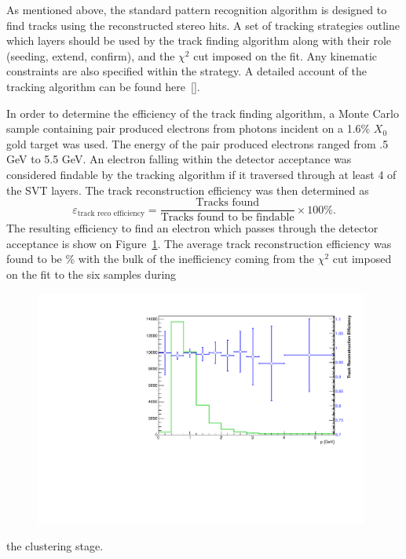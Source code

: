 As mentioned above, the standard pattern recognition algorithm is designed to 
find tracks using the reconstructed stereo hits.  A set of tracking strategies
outline which layers should be used by the track finding algorithm along
with their role (seeding, extend, confirm), and the $\chi^2$ cut imposed 
on the fit. Any kinematic constraints are also specified within the strategy.
A detailed account of the tracking algorithm can be found  here~\ref{}.

In order to determine the efficiency of the track finding algorithm, a Monte
Carlo sample containing pair produced electrons from photons incident on 
a 1.6\% $X_0$ gold target was used.  The energy of the pair produced electrons
ranged from .5 GeV to 5.5 GeV. An electron falling within the detector 
acceptance was considered findable by the tracking algorithm if it 
traversed through at least 4 of the SVT layers. The track reconstruction
efficiency was then determined as
\[
    \varepsilon_{\mbox{track reco efficiency}} = \frac{\mbox{Tracks found}}
                                            {\mbox{Tracks found to be findable}} \times 100 \%.
\]
The resulting efficiency to find an electron which passes through the detector
acceptance is show on Figure~\ref{fig:trk_efficiency}. The average track
reconstruction efficiency was found to be \% with the bulk of the inefficiency
coming from the $\chi^2$ cut imposed on the fit to the six samples during
\begin{figure}[h]
    \begin{center}
    	\includegraphics[width=0.98\textwidth]{test2012/svtperformance/trk_performance/track_reco_efficiency.pdf}
        \caption{} 
	\label{fig:trk_efficiency}
    \end{center}
\end{figure}
the clustering stage.

